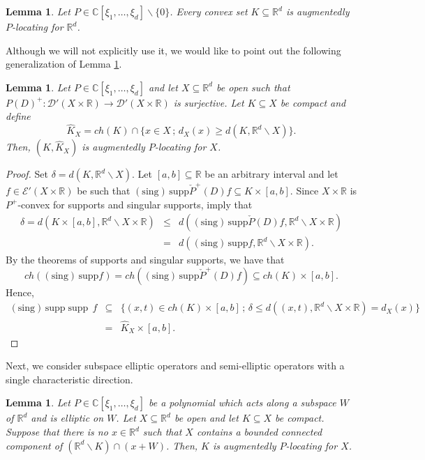 \documentclass[12pt]{amsart}
\newcommand{\R}{\mathbb{R}}
\newcommand{\C}{\mathbb{C}}
\newcommand{\supp}{\operatorname{supp}\,}
\newtheorem{lemma}[theorem]{Lemma}
\theoremstyle{definition}
\theoremstyle{remark}
\numberwithin{equation}{section}
\begin{document}
 \begin{lemma}\label{prop: location of sing/supp-convex}
 	Let $P \in\C[\xi_1,\ldots, \xi_d] \backslash \{0\}$. Every convex set  $K \subseteq \R^d$ is augmentedly $P$-locating for $\R^d$.
 \end{lemma}
Although we will not explicitly use it, we would like to point out the following generalization of Lemma \ref{prop: location of sing/supp-convex}.
\begin{lemma}\label{prop: location of sing/supp-simple}
	Let $P \in\C[\xi_1,\ldots,\xi_d]$ and let $X\subseteq\R^d$ be open such that $P(D)^+: \mathscr{D}'(X\times\R) \rightarrow \mathscr{D}'(X\times\R)$ is surjective. Let $K \subseteq X$ be compact and define 
	$$\hat{K}_X=ch(K)\cap\{x\in X \,; \,d_X(x)\geq d(K,\R^d\backslash X)\}.$$
	Then, $(K,\hat{K}_X)$ is augmentedly $P$-locating for $X$.
\end{lemma}
\begin{proof} Set $\delta =d(K,\R^d\backslash X)$. 
		 Let $[a,b] \subseteq \R$ be an arbitrary interval and let  $f \in\mathscr{E}'(X\times\R)$ be such that $\operatorname{(sing)\, supp}\check{P}^+(D)f \subseteq K\times[a,b]$. Since  $X\times\R$ is $P^+$-convex for supports and singular supports, \cite[Theorem 10.6.3 and Theorem 10.7.3]{HoermanderPDO2} imply that
		 \begin{eqnarray*}
		\delta= d(K\times[a,b],\R^d \backslash X \times\R) &\leq& d(\operatorname{(sing)\, supp} \check{P}(D)f ,\R^d \backslash X \times\R) \\
		&=&d(\operatorname{(sing)\, supp} f,\R^d \backslash X \times\R).
		 \end{eqnarray*}
By	the theorems of supports and singular supports, we have that
$$ch(\operatorname{(sing)\, supp} f)=ch(\operatorname{(sing)\, supp}\check{P}^+(D)f) \subseteq ch(K) \times [a,b].$$
Hence,
	\begin{eqnarray*}
		\operatorname{(sing)\, supp}\supp f&\subseteq& \{(x,t)\in ch(K)\times[a,b] \, ; \,\delta\leq d\left((x,t),\R^d \backslash X \times\R\right)=d_X(x)\} \\
		&=&\hat{K}_X\times[a,b].
	\end{eqnarray*}
\end{proof}

Next, we consider subspace elliptic  operators and semi-elliptic operators with a single characteristic direction.
 
\begin{lemma}\label{lem: location of sing/supp-subspace}
	Let $P \in\C[\xi_1,\ldots,\xi_d]$ be  a polynomial which acts along a subspace $W$ of $\R^d$ and is elliptic on $W$. Let $X \subseteq \R^d$ be open and let $K \subseteq X$ be compact. Suppose that there is no $x\in\R^d$ such that  $X$ contains a bounded connected component of $(\R^d\backslash K)\cap (x+W)$. Then, $K$ is augmentedly $P$-locating for $X$.
\end{lemma}	
\end{document}
